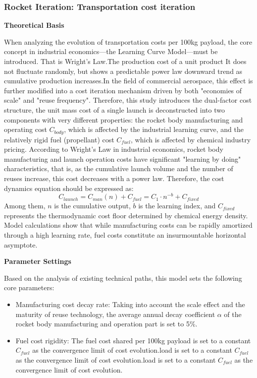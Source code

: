 \subsubsection{Rocket Iteration: Transportation cost iteration}
\medskip
\noindent\textbf{Theoretical Basis}\par
When analyzing the evolution of transportation costs per 100kg payload, the core concept in industrial economics—the Learning Curve Model—must be introduced.
That is Wright's Law.The production cost of a unit product It does not fluctuate randomly, but shows a predictable power law downward trend as cumulative production increases.In the field of commercial aerospace, this effect is further modified into a cost iteration mechanism driven by both "economies of scale" and "reuse frequency".
Therefore, this study introduces the dual-factor cost structure, the unit mass cost of a single launch is deconstructed into two components with very different properties: the rocket body manufacturing and operating cost $C_{body}$, which is affected by the industrial learning curve, and the relatively rigid fuel (propellant) cost $C_{fuel}$, which is affected by chemical industry pricing.
According to Wright's Law in industrial economics, rocket body manufacturing and launch operation costs have significant "learning by doing" characteristics, that is, as the cumulative launch volume and the number of reuses increase, this cost decreases with a power law. 
Therefore, the cost dynamics equation should be expressed as:
\[C_{launch}=C_{man}(n)+C_{fuel}=C_1\cdot n^{-b}+C_{fixed}\]
\indent Among them, $n$ is the cumulative output, $b$ is the learning index, and $C_{fixed}$ represents the thermodynamic cost floor determined by chemical energy density.
Model calculations show that while manufacturing costs can be rapidly amortized through a high learning rate, fuel costs constitute an insurmountable horizontal asymptote.

\medskip
\noindent\textbf{Parameter Settings}\par
Based on the analysis of existing technical paths, this model sets the following core parameters: 
\begin{itemize}
  \item Manufacturing cost decay rate: Taking into account the scale effect and the maturity of reuse technology, the average annual decay coefficient $\alpha$ of the rocket body manufacturing and operation part is set to 5\%.
  \item Fuel cost rigidity: The fuel cost shared per 100kg payload is set to a constant $C_{fuel}$ as the convergence limit of cost evolution.load is set to a constant $C_{fuel}$ as the convergence limit of cost evolution.load is set to a constant $C_{fuel}$ as the convergence limit of cost evolution.
\end{itemize}

